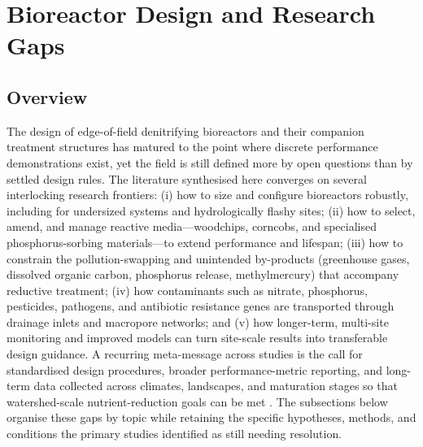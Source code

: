 \documentclass[11pt]{article}
\begin{document}
\section*{Bioreactor Design and Research Gaps}

\subsection{Overview}
The design of edge-of-field denitrifying bioreactors and their companion treatment structures has matured to the point where discrete performance demonstrations exist, yet the field is still defined more by open questions than by settled design rules. The literature synthesised here converges on several interlocking research frontiers: (i) how to size and configure bioreactors robustly, including for undersized systems and hydrologically flashy sites; (ii) how to select, amend, and manage reactive media---woodchips, corncobs, and specialised phosphorus-sorbing materials---to extend performance and lifespan; (iii) how to constrain the pollution-swapping and unintended by-products (greenhouse gases, dissolved organic carbon, phosphorus release, methylmercury) that accompany reductive treatment; (iv) how contaminants such as nitrate, phosphorus, pesticides, pathogens, and antibiotic resistance genes are transported through drainage inlets and macropore networks; and (v) how longer-term, multi-site monitoring and improved models can turn site-scale results into transferable design guidance. A recurring meta-message across studies is the call for standardised design procedures, broader performance-metric reporting, and long-term data collected across climates, landscapes, and maturation stages so that watershed-scale nutrient-reduction goals can be met \parencite{Christianson2021,Maxwell2022,Bell2015}. The subsections below organise these gaps by topic while retaining the specific hypotheses, methods, and conditions the primary studies identified as still needing resolution.
\end{document}
